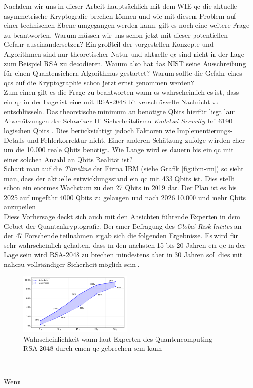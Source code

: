 Nachdem wir uns in dieser Arbeit hauptsächlich mit dem WIE \ac{qc} die aktuelle asymmetrische Kryptografie brechen können und wie mit diesem Problem auf einer technischen Ebene umgegangen werden kann, gilt es noch eine weitere Frage zu beantworten. Warum müssen wir uns schon jetzt mit dieser potentiellen Gefahr auseinandersetzen? Ein großteil der vorgestellen Konzepte und Algorithmen sind nur theoretischer Natur und aktuelle \ac{qc} sind nicht in der Lage zum Beispiel RSA zu decodieren. Warum also hat das NIST seine Ausschreibung für einen Quantensichern Algorithmus gestartet? Warum sollte die Gefahr eines \ac{qc}s auf die Kryptographie schon jetzt ernst genommen werden?\\
Zum einen gilt es die Frage zu beantworten wann es  wahrscheinlich es ist, dass ein \ac{qc} in der Lage ist eine mit RSA-2048 bit verschlüsselte Nachricht zu entschlüsseln. Das theoretische minimum an benötigte Qbits hierfür liegt laut Abschätzungen der Schweizer IT-Sicherheitsfirma \textit{Kudelski Security} bei 6190 logischen Qbits \cite{gagliardoni_quantum_2021}. Dies berücksichtigt jedoch Faktoren wie Implementierungs-Details und Fehlerkorrektur nicht. Einer anderen Schätzung zufolge würden eher um die 10.000 reale Qbits benötigt\cite{ziegler_online_2015}. Wie Lange wird es dauern bis ein \ac{qc} mit einer solchen Anzahl an Qbits Realität ist?\\
Schaut man auf die \textit{Timeline} der Firma IBM (siehe Grafik \ref{fig:ibm-rm}) so sieht man, dass der aktuelle entwicklungsstand ein \ac{qc} mit 433 Qbits ist. Dies stellt schon ein enormes Wachstum zu den 27 Qbits in 2019 dar. Der Plan ist es bis 2025 auf ungefähr 4000 Qbits zu gelangen und nach 2026 10.000 und mehr Qbits anzupeilen \cite{noauthor_ibm_2015}.\\
Diese Vorhersage deckt sich auch mit den Ansichten führende Experten in dem Gebiet der Quantenkryptografie. Bei einer Befragung des \textit{Global Risk Intites} an der 47 Forschende teilnahmen ergab sich die folgenden Ergebnisse. Es wird für sehr wahrscheinlich gehalten, dass in den nächsten 15 bis 20 Jahren ein \ac{qc} in der Lage sein wird RSA-2048 zu brechen mindestens aber in 30 Jahren soll dies mit nahezu vollständiger Sicherheit möglich sein \cite{noauthor_2021_nodate}.

\begin{figure}[!hbt]
    \centering
    \includegraphics[width=0.5\textwidth]{images/estiamte-qc.png}
    \caption{Wahrscheinlichkeit wann laut Experten des Quantencomputing RSA-2048 durch einen \ac{qc} gebrochen sein kann \cite{noauthor_2021_nodate}}
    \label{fig:qx-approx}
\end{figure}\

Wenn 